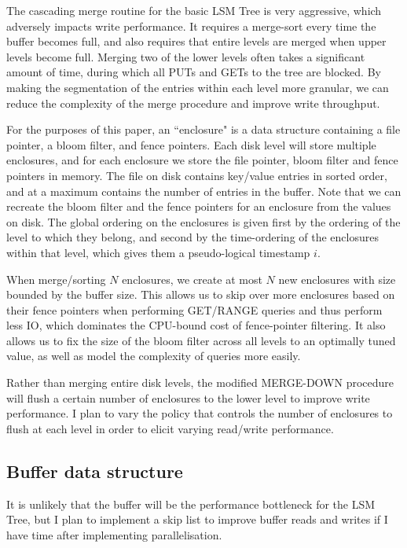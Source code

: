 \documentclass{acm}
\begin{document}
The cascading merge routine for the basic LSM Tree is very aggressive, which adversely impacts write performance. It requires a merge-sort every time the buffer becomes full, and also requires that entire levels are merged when upper levels become full. Merging two of the lower levels often takes a significant amount of time, during which all PUTs and GETs to the tree are blocked. By making the segmentation of the entries within each level more granular, we can reduce the complexity of the merge procedure and improve write throughput.

For the purposes of this paper, an ``enclosure" is a data structure containing a file pointer, a bloom filter, and fence pointers. Each disk level will store multiple enclosures, and for each enclosure we store the file pointer, bloom filter and fence pointers in memory. The file on disk contains key/value entries in sorted order, and at a maximum contains the number of entries in the buffer. Note that we can recreate the bloom filter and the fence pointers for an enclosure from the values on disk. The global ordering on the enclosures is given first by the ordering of the level to which they belong, and second by the time-ordering of the enclosures within that level, which gives them a pseudo-logical timestamp $i$. 

When merge/sorting $N$ enclosures, we create at most $N$ new enclosures with size bounded by the buffer size. This allows us to skip over more enclosures based on their fence pointers when performing GET/RANGE queries and thus perform less IO, which dominates the CPU-bound cost of fence-pointer filtering. It also allows us to fix the size of the bloom filter across all levels to an optimally tuned value, as well as model the complexity of queries more easily.

Rather than merging entire disk levels, the modified MERGE-DOWN procedure will flush a certain number of enclosures to the lower level to improve write performance. I plan to vary the policy that controls the number of enclosures to flush at each level in order to elicit varying read/write performance.

\subsection{Buffer data structure}

It is unlikely that the buffer will be the performance bottleneck for the LSM Tree, but I plan to implement a skip list to improve buffer reads and writes if I have time after implementing parallelisation.
\end{document}
